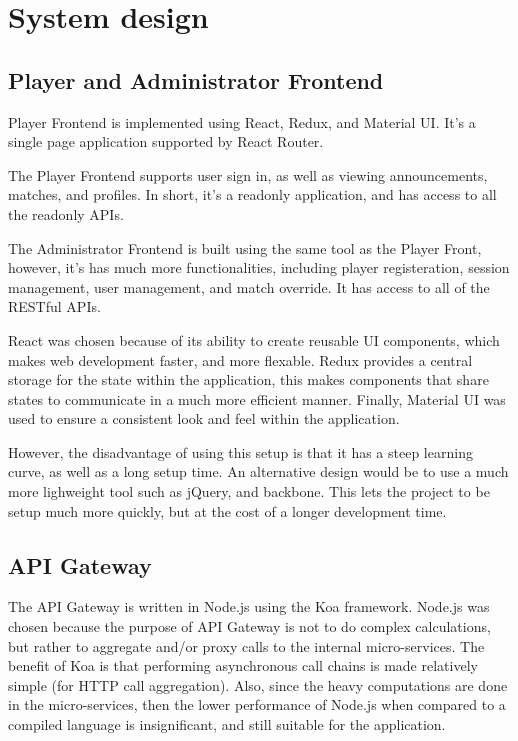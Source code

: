 \documentclass{article}
\begin{document}
\newpage


\section{System design}

\subsection{Player and Administrator Frontend}
Player Frontend is implemented using React, Redux, and Material UI. It's a single page application supported by React Router.

The Player Frontend supports user sign in, as well as viewing announcements, matches, and profiles. In short, it's a readonly application, and has access to all the readonly APIs.

The Administrator Frontend is built using the same tool as the Player Front, however, it's has much more functionalities, including player registeration, session management, user management, and match override. It has access to all of the RESTful APIs.

React was chosen because of its ability to create reusable UI components, which makes web development faster, and more flexable. Redux provides a central storage for the state within the application, this makes components that share states to communicate in a much more efficient manner. Finally, Material UI was used to ensure a consistent look and feel within the application.

However, the disadvantage of using this setup is that it has a steep learning curve, as well as a long setup time. An alternative design would be to use a much more lighweight tool such as jQuery, and backbone. This lets the project to be setup much more quickly, but at the cost of a longer development time.

\subsection{API Gateway}
The API Gateway is written in Node.js using the Koa framework. Node.js was chosen because the purpose of API Gateway is not to do complex calculations, but rather to aggregate and/or proxy calls to the internal micro-services. The benefit of Koa is that performing asynchronous call chains is made relatively simple (for HTTP call aggregation). Also, since the heavy computations are done in the micro-services, then the lower performance of Node.js when compared to a compiled language is insignificant, and still suitable for the application.
\end{document}
